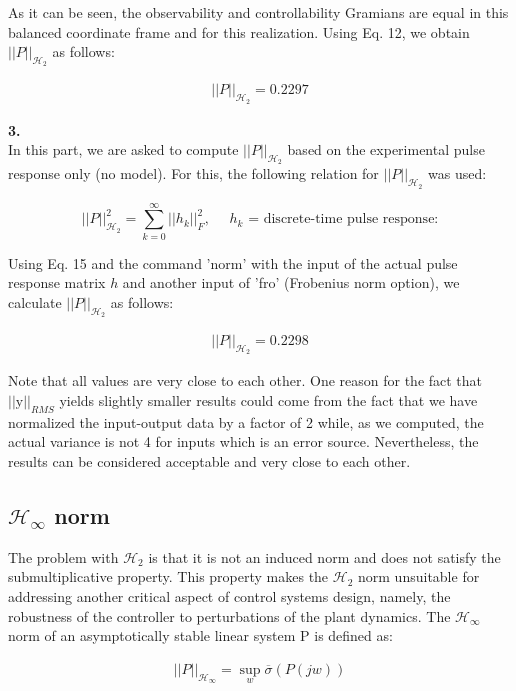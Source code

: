 \documentclass[paper=US leter, fontsize=11pt]{scrartcl}
\begin{document}
As it can be seen, the observability and controllability Gramians are equal in this balanced coordinate frame and for this realization. Using Eq. 12, we obtain $||P||_{\mathcal{H}_{2}}$ as follows:

\begin{gather*}
	||P||_{\mathcal{H}_{2}} = 0.2297
\end{gather*}

\vspace{20pt}
\textbf{3.}\\
In this part, we are asked to compute $||P||_{\mathcal{H}_{2}}$ based on the experimental pulse response only (no model). For this, the following relation for $||P||_{\mathcal{H}_{2}}$ was used:

\begin{equation}
||P||^{2}_{\mathcal{H}_{2}} = \sum_{k=0}^{\infty} ||h_{k}||_{F}^{2}, \text{      } \text{      } h_{k}\text{ = discrete-time pulse response:}
\tag{15}
\end{equation}

Using Eq. 15 and the command 'norm' with the input of the actual pulse response matrix $h$ and another input of 'fro' (Frobenius norm option), we calculate $||P||_{\mathcal{H}_{2}}$ as follows:


\begin{gather*}
||P||_{\mathcal{H}_{2}} = 0.2298
\end{gather*}

Note that all values are very close to each other. One reason for the fact that $||\text{y}||_{RMS}$ yields slightly smaller results could come from the fact that we have normalized the input-output data by a factor of 2 while, as we computed, the actual variance is not 4 for inputs which is an error source. Nevertheless, the results can be considered acceptable and very close to each other.

\subsection{$\mathcal{H}_{\infty}$ norm}
The problem with $\mathcal{H}_{2}$ is that it is not an induced norm and does not satisfy the submultiplicative property. This property makes the $\mathcal{H}_{2}$ norm unsuitable for addressing another critical aspect of control systems design, namely, the robustness of the controller to perturbations of the plant dynamics. The $\mathcal{H}_{\infty}$ norm of an asymptotically stable linear system P is defined as:

\begin{gather*}
	 ||P||_{\mathcal{H}_{\infty}} = \sup_{w}\overline{\sigma}(P(jw))
\end{gather*}
\end{document}
